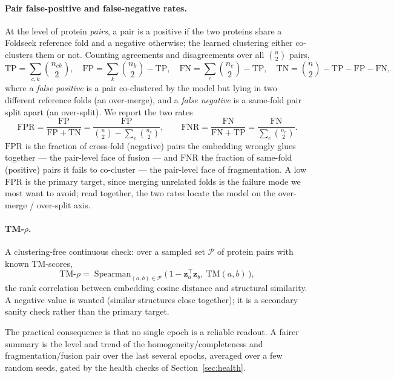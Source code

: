 \documentclass[11pt,a4paper]{article}
\theoremstyle{definition}
\begin{document}
\paragraph{Pair false-positive and false-negative rates.} At the level of protein
\emph{pairs}, a pair is a positive if the two proteins share a Foldseek reference
fold and a negative otherwise; the learned clustering either co-clusters them or
not. Counting agreements and disagreements over all $\binom{n}{2}$ pairs,
\[
\mathrm{TP}=\sum_{c,k}\binom{n_{ck}}{2},\quad
\mathrm{FP}=\sum_k\binom{n_k}{2}-\mathrm{TP},\quad
\mathrm{FN}=\sum_c\binom{n_c}{2}-\mathrm{TP},\quad
\mathrm{TN}=\binom{n}{2}-\mathrm{TP}-\mathrm{FP}-\mathrm{FN},
\]
where a \emph{false positive} is a pair co-clustered by the model but lying in two
different reference folds (an over-merge), and a \emph{false negative} is a same-fold
pair split apart (an over-split). We report the two rates
\[
\mathrm{FPR}=\frac{\mathrm{FP}}{\mathrm{FP}+\mathrm{TN}}=\frac{\mathrm{FP}}{\binom{n}{2}-\sum_c\binom{n_c}{2}},
\qquad
\mathrm{FNR}=\frac{\mathrm{FN}}{\mathrm{FN}+\mathrm{TP}}=\frac{\mathrm{FN}}{\sum_c\binom{n_c}{2}}.
\]
$\mathrm{FPR}$ is the fraction of cross-fold (negative) pairs the embedding wrongly
glues together --- the pair-level face of fusion --- and $\mathrm{FNR}$ the fraction
of same-fold (positive) pairs it fails to co-cluster --- the pair-level face of
fragmentation. A low $\mathrm{FPR}$ is the primary target, since merging unrelated
folds is the failure mode we most want to avoid; read together, the two rates locate
the model on the over-merge / over-split axis.

\paragraph{TM-$\rho$.} A clustering-free continuous check: over a sampled set
$\mathcal{P}$ of protein pairs with known TM-scores,
\[
\mathrm{TM}\text{-}\rho=\operatorname{Spearman}_{(a,b)\in\mathcal{P}}\big(\,1-\mathbf{z}_a^{\top}\mathbf{z}_b,\ \mathrm{TM}(a,b)\,\big),
\]
the rank correlation between embedding cosine distance and structural similarity.
A negative value is wanted (similar structures close together); it is a secondary
sanity check rather than the primary target.

The practical consequence is that no single epoch is a reliable readout. A fairer
summary is the level and trend of the homogeneity/completeness and
fragmentation/fusion pair over the last several epochs, averaged over a few random
seeds, gated by the health checks of Section~\ref{sec:health}.
\end{document}
